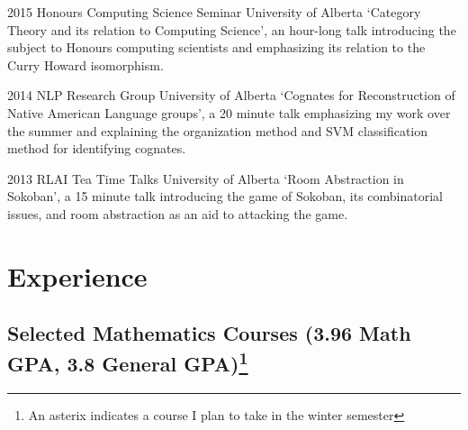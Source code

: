 \documentclass{friggeri-cv} %
\begin{document}
\begin{entrylist}

\entry
{2015}
{Honours Computing Science Seminar}
{University of Alberta}
{`Category Theory and its relation to Computing Science', an hour-long talk introducing the subject to Honours computing scientists and emphasizing its relation to the Curry Howard isomorphism.}


\entry
{2014}
{NLP Research Group}
{University of Alberta}
{`Cognates for Reconstruction of Native American Language groups', a 20 minute talk emphasizing my work over the summer and explaining the organization method and SVM classification method for identifying cognates.}


\entry
{2013}
{RLAI Tea Time Talks}
{University of Alberta}
{`Room Abstraction in Sokoban', a 15 minute talk introducing the game of Sokoban, its combinatorial issues, and room abstraction as an aid to attacking the game.}

\end{entrylist}


\section{Experience}

\subsection{Selected Mathematics Courses (3.96 Math GPA, 3.8 General GPA)\footnote{An asterix indicates a course I plan to take in the winter semester}}
\end{document}
